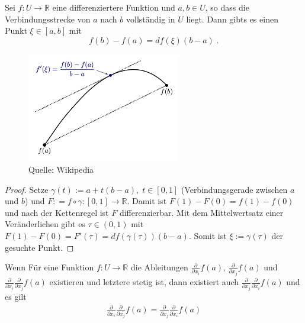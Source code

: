 \begin{Satz}[Mittelwertsatz]
Sei $f :U \to \mathbb{R}$ eine differenziertere Funktion und $a, b \in U$, so dass die Verbindungsstrecke von $a$ nach $b$ vollständig in $U$ liegt. 
Dann gibts es einen Punkt $\xi \in [a,b]$ mit
$$f(b) - f(a) = df(\xi) (b-a) \; .$$ 
\end{Satz}
\begin{figure}[H]
      \centering
    \includegraphics[width=0.6\textwidth]{images/Mittelwertsatz3.png}
      \caption{Quelle: Wikipedia}
\end{figure}
\begin{proof}
Setze $\gamma(t) := a + t(b-a), \; t \in [0,1]$ (Verbindungsgerade zwischen $a$ und $b$) und $F : = f  \circ \gamma : [0,1] \to \mathbb{R}$.
Damit ist $F(1)- F(0) = f(1) - f(0)$ und nach der Kettenregel ist $F$ differenzierbar.  Mit dem Mittelwertsatz einer Veränderlichen gibt es $\tau \in (0,1)$ mit 
$F(1) - F(0) = F'(\tau) = df(\gamma (\tau)) (b-a)$. Somit ist $\xi := \gamma(\tau)$ der gesuchte Punkt.
\end{proof}


\begin{Satz}
Wenn Für eine Funktion $f: U \to \mathbb{R}$ die Ableitungen $\frac{\partial}{\partial x_i} f(a)$, $\frac{\partial}{\partial x_j}f(a)$ und $ \frac{\partial}{\partial x_i}\frac{\partial }{\partial x_j} f(a)$ existieren und letztere stetig ist, dann existiert auch $ \frac{\partial}{\partial x_j}\frac{\partial }{\partial x_i} f(a)$ und es gilt
\begin{align*}
\frac{\partial}{\partial x_i}\frac{\partial }{\partial x_j} f(a) = \frac{\partial}{\partial x_j}\frac{\partial }{\partial x_i} f(a)
\end{align*}
\end{Satz}


